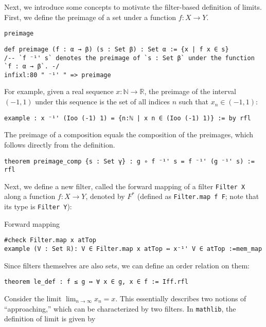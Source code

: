 \documentclass[a4paper]{article}
\begin{document}
Next, we introduce some concepts to motivate the filter-based definition of limits. First, we define the preimage of a set under a function \( f : X \to Y \).
\begin{dfn}{\texttt{preimage}}
\begin{lstlisting}[style = lean]
def preimage (f : α → β) (s : Set β) : Set α := {x | f x ∈ s}
/-- `f ⁻¹' s` denotes the preimage of `s : Set β` under the function `f : α → β`. -/
infixl:80 " ⁻¹' " => preimage
\end{lstlisting} 
\end{dfn}
For example, given a real sequence \texttt{$x : \mathbb{N} \to \mathbb{R}$}, the preimage of the interval \((-1,1)\) under this sequence is the set of all indices \(n\) such that \(x_n \in (-1,1)\):
\begin{xmp}{}
\begin{lstlisting}[style=lean]
example : x ⁻¹' (Ioo (-1) 1) = {n:ℕ | x n ∈ (Ioo (-1) 1)} := by rfl
\end{lstlisting}  
\end{xmp}
The preimage of a composition equals the composition of the preimages, which follows directly from the definition.
\begin{xmp}{}
\begin{lstlisting}[style=lean]
theorem preimage_comp {s : Set γ} : g ∘ f ⁻¹' s = f ⁻¹' (g ⁻¹' s) := rfl
\end{lstlisting}
\end{xmp}
Next, we define a new filter, called the forward mapping of a filter \texttt{Filter X} along a function \(f : X \to Y\), denoted by \(F^*\) (defined as \texttt{Filter.map f F}; note that its type is \texttt{Filter Y}):
\begin{dfn}{Forward mapping}
\label{xmp:forward}
\begin{lstlisting}[style = lean]
#check Filter.map x atTop
example (V : Set ℝ): V ∈ Filter.map x atTop ↔ x⁻¹' V ∈ atTop :=mem_map
\end{lstlisting}
\end{dfn}
Since filters themselves are also sets, we can define an order relation on them:
\begin{xmp}{}
\begin{lstlisting}[style = lean]
theorem le_def : f ≤ g ↔ ∀ x ∈ g, x ∈ f := Iff.rfl
\end{lstlisting}
\end{xmp}
Consider the limit \(\lim_{n \to \infty} x_n = x\). This essentially describes two notions of “approaching,” which can be characterized by two filters. In \texttt{mathlib}, the definition of limit is given by
\end{document}
